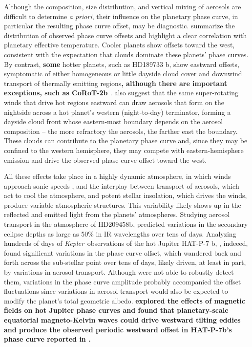 \documentclass[manuscript]{aastex62}
\newcommand{\kepler}{{\it Kepler}}
\begin{document}
Although the composition, size distribution, and vertical mixing of aerosols are difficult to determine \emph{a priori}, their influence on the planetary phase curve, in particular the resulting phase curve offset, may be diagnostic. \citet{2016ApJ...828...22P} summarize the distribution of observed phase curve offsets and highlight a clear correlation with planetary effective temperature. Cooler planets show offsets toward the west, consistent with the expectation that clouds dominate these planets' phase curves. By contrast, \textbf{some} hotter planets, such as HD189733 b, show eastward offsets, symptomatic of either homogeneous or little dayside cloud cover and downwind transport of thermally emitting regions\textbf{, although there are important exceptions, such as CoRoT-2b \citep{2018NatAs...2..220D}}. \citet{2016ApJ...828...22P} also suggest that the same super-rotating winds that drive hot regions eastward can draw aerosols that form on the nightside across a hot planet's western (night-to-day) terminator, forming a dayside cloud front whose eastern-most boundary depends on the aerosol composition -- the more refractory the aerosols, the farther east the boundary. These clouds can contribute to the planetary phase curve and, since they may be confined to the western hemisphere, they may compete with eastern-hemisphere emission and drive the observed phase curve offset toward the west.

All these effects take place in a highly dynamic atmosphere, in which winds approach sonic speeds \citep{2018ApJ...853..133K}, and the interplay between transport of aerosols, which act to cool the atmosphere, and potent stellar insolation, which drives the winds, produce variable atmospheric structures. This variability likely shows up in the reflected and emitted light from the planets' atmospheres. Studying aerosol transport in the atmosphere of HD209458b, \citet{2013A&A...558A..91P} predicted variations in the secondary eclipse depths as large as 50\% in IR wavelengths over tens of days. Analyzing hundreds of days of \kepler\ observations of the hot Jupiter HAT-P-7 b, \citet{2016NatAs...1E...4A}, indeeed, found significant variations in the phase curve offset, which wandered back and forth across the sub-stellar point over tens of days, likely driven, at least in part, by variations in aerosol transport. Although \citet{2016NatAs...1E...4A} were not able to robustly detect them, variations in the phase curve amplitude probably accompanied the offset fluctuations since variations in aerosol transport would also be expected to modify the planet's total geometric albedo. \textbf{\citet{2019ApJ...872L..27H} explored the effects of magnetic fields on hot Jupiter phase curves and found that planetary-scale equatorial magneto-Kelvin waves could drive westward tilting eddies and produce the observed periodic westward offset in HAT-P-7b's phase curve reported in \citet{2016NatAs...1E...4A}.}
\end{document}
